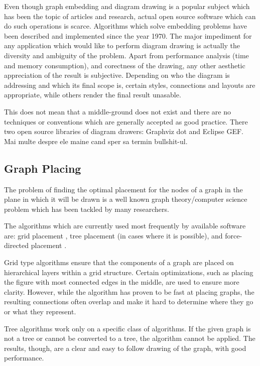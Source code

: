 Even though graph embedding and diagram drawing is a popular subject which has been the topic of articles and research, 
actual open source software which can do such operations is scarce. Algorithms which solve embedding problems have been 
described and implemented since the year 1970. The major impediment for any application which would like to perform 
diagram drawing is actually the diversity and ambiguity of the problem. Apart from performance analysis (time and 
memory consumption), and corectness of the drawing, any other aesthetic appreciation of the result is subjective.
Depending on who the diagram is addressing and which its final scope is, certain styles, connections and layouts are 
appropriate, while others render the final result unasable.

This does not mean that a middle-ground does not exist and there are no techniques or conventions which are 
generally accepted as good practice. There two open source libraries of diagram drawers: Graphviz dot and 
Eclipse GEF. Mai multe despre ele maine cand sper sa termin bullshit-ul.

\subsection{Graph Placing}

The problem of finding the optimal placement for the nodes of a graph in the plane
in which it will be drawn is a well known graph theory/computer science problem
which has been tackled by many researchers.

The algorithms which are currently used most frequently by available software are:
grid placement , tree placement (in cases where it is possible), and force-directed placement \cite{hu2005efficient}.

Grid type algorithms ensure that the components of a graph are placed on hierarchical layers within a
grid structure. Certain optimizations, such as placing the figure with most connected edges in the middle,
are used to ensure more clarity. However, while the algorithm has proven to be fast at placing graphs,
the resulting connections often overlap and make it hard to determine where they go or what they represent.

Tree algorithms work only on a specific class of algorithms. If the given graph is not a tree or cannot be
converted to a tree, the algorithm cannot be applied. The results, though, are a clear and easy to follow
drawing of the graph, with good performance.

